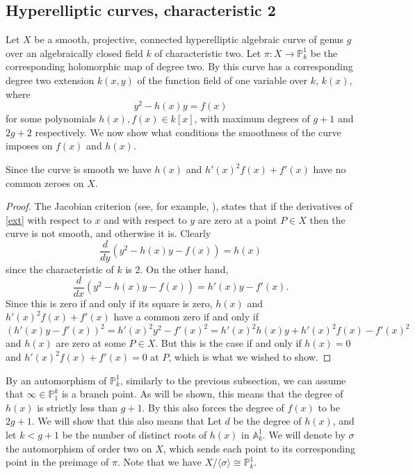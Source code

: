 \subsection{Hyperelliptic curves, characteristic 2}
Let $X$ be a smooth, projective, connected hyperelliptic algebraic curve of genus $g$ over an algebraically closed field $k$ of characteristic two.
Let $\pi:X \rightarrow \mathbb P_k^1$ be the corresponding holomorphic map of degree two.
By \cite[Prop. 7.4.24]{liu} this curve has a corresponding degree two extension $k(x,y)$ of the function field of one variable over $k$, $k(x)$, where
\begin{equation}\label{ext}
y^2 - h(x)y = f(x)
\end{equation}
for some polynomials $h(x), f(x)\in k[x]$, with maximum degrees of $g+1$ and $2g+2$ respectively.
We now show what conditions the smoothness of the curve imposes on $f(x)$ and $h(x)$.



\begin{lem}\label{smoothness}
Since the curve is smooth we have $h(x)$ and $h'(x)^2 f(x) + f'(x)$ have no common zeroes on $X$.
\end{lem}
\begin{proof}
The Jacobian criterion (see, for example, \cite[Thm. 4.2.19]{liu}), states that if the derivatives of \eqref{ext} with respect to $x$ and with respect to $y$ are zero at a point $P\in X$ then the curve is not smooth, and otherwise it is.
Clearly \[
\frac{d}{dy} (y^2 -h(x)y -f(x)) = h(x)
\]
since the characteristic of $k$ is 2.
On the other hand,
\[
\frac{d}{dx} (y^2 - h(x)y -f(x)) = h'(x)y - f'(x).
\]
Since this is zero if and only if its square is zero, $h(x)$ and $h'(x)^2 f(x) + f'(x)$ have a common zero if and only if
\[
(h'(x)y-f'(x))^2 = h'(x)^2y^2 -f'(x)^2 = h'(x)^2h(x)y + h'(x)^2f(x) - f'(x)^2
\]
and $h(x)$ are zero at some $P\in X$.
But this is the case if and only if $h(x) = 0$ and $h'(x)^2f(x) + f'(x) = 0$ at $P$, which is what we wished to show.
\end{proof}

By an automorphism of $\mathbb P_k^1$, similarly to the previous subsection, we can assume that $\infty\in \mathbb P_1^k$ is a branch point.
As will be shown, this means that the degree of $h(x)$ is strictly less than $g+1$.
By \cite[Prop. 7.4.24]{liu} this also forces the degree of $f(x)$ to be $2g+1$.
We will show that this also means that
Let $d$ be the degree of $h(x)$, and let $k< g+1$ be the number of distinct roots of $h(x)$ in $\mathbb A_k^1$.
We will denote by $\sigma$ the automorphism of order two on $X$, which sends each point to its corresponding point in the preimage of $\pi$. 
Note that we have $X/\langle \sigma \rangle \cong \mathbb P_k^1$.


